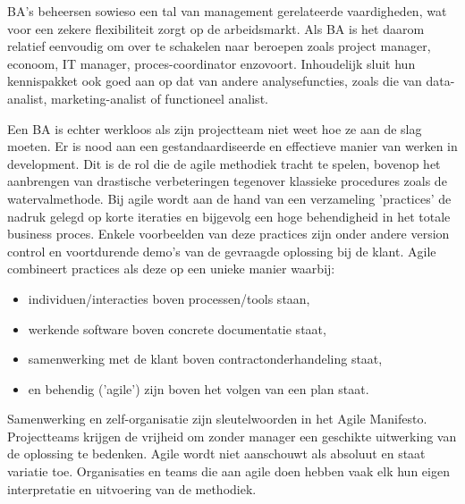 \documentclass{hogent-article}
\begin{document}
BA's beheersen sowieso een tal van management gerelateerde vaardigheden, wat 
voor een zekere flexibiliteit zorgt op de arbeidsmarkt. Als BA is het daarom relatief eenvoudig 
om over te schakelen naar beroepen zoals project manager, econoom, IT manager, proces-coordinator 
enzovoort. Inhoudelijk sluit hun kennispakket ook goed aan op dat van andere analysefuncties, 
zoals die van data-analist, marketing-analist of functioneel analist. \autocite{bac1} \autocite{bac2}

Een BA is echter werkloos als zijn projectteam niet weet hoe ze aan de slag moeten. Er is nood
aan een gestandaardiseerde en effectieve manier van werken in development. Dit is de rol
die de agile methodiek tracht te spelen, bovenop het aanbrengen van drastische verbeteringen 
tegenover klassieke procedures zoals de watervalmethode. Bij agile wordt aan de hand van een
verzameling 'practices' de nadruk gelegd op korte iteraties en bijgevolg een hoge
behendigheid in het totale business proces. Enkele voorbeelden van deze practices zijn
onder andere version control en voortdurende demo's van de gevraagde oplossing bij de klant.
Agile combineert practices als deze op een unieke manier waarbij:
\begin{itemize}
  \item individuen/interacties boven processen/tools staan,
  \item werkende software boven concrete documentatie staat,
  \item samenwerking met de klant boven contractonderhandeling staat,
  \item en behendig ('agile') zijn boven het volgen van een plan staat.
\end{itemize}
Samenwerking en zelf-organisatie zijn sleutelwoorden in het Agile Manifesto. Projectteams
krijgen de vrijheid om zonder manager een geschikte uitwerking van de oplossing te bedenken.
Agile wordt niet aanschouwt als absoluut en staat variatie toe. Organisaties en teams die 
aan agile doen hebben vaak elk hun eigen interpretatie en uitvoering van de methodiek. \autocite{artagile}
\end{document}
